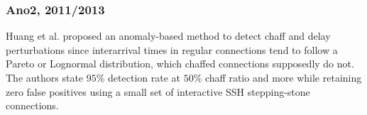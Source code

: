 \documentclass[runningheads,11pt]{llncs}\usepackage[]{graphicx}\usepackage[]{color}
\begin{document}
\subsubsection{Ano2, 2011/2013}
Huang et al. \cite{huang2011detecting,ding2013detecting} proposed an anomaly-based method to detect chaff and delay perturbations since interarrival times in regular connections tend to follow a Pareto or Lognormal distribution, which chaffed connections supposedly do not. %
The authors state $95\%$ detection rate at $50\%$ chaff ratio and more while retaining zero false positives using a small set of interactive SSH stepping-stone connections.




\vspace{-0.6cm}
\end{document}

